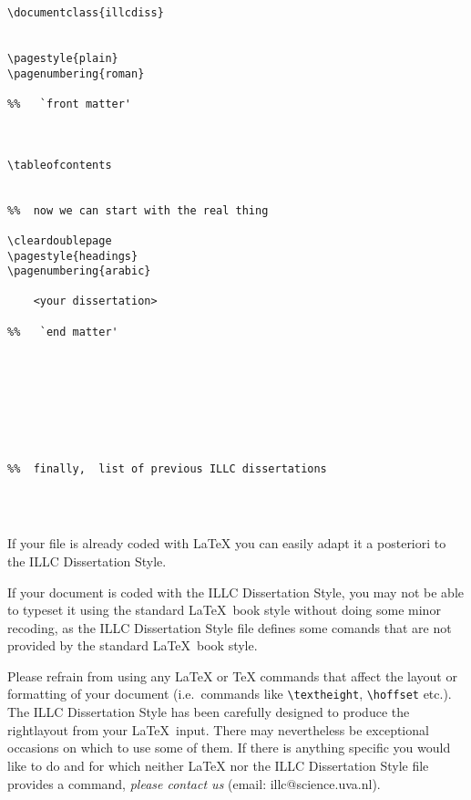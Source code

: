 \begin{verbatim}
\documentclass{illcdiss}


\pagestyle{plain}
\pagenumbering{roman}

%%   `front matter'



\tableofcontents


%%  now we can start with the real thing

\cleardoublepage
\pagestyle{headings}
\pagenumbering{arabic}
  
    <your dissertation>

%%   `end matter'








%%  finally,  list of previous ILLC dissertations




\end{verbatim}
%
%
If your file is already coded with \LaTeX{} you can easily
adapt it a posteriori to the ILLC Dissertation Style.

If your document is coded with the ILLC Dissertation Style,
you may not be able to typeset it using the standard \LaTeX\ book style
without doing some minor recoding,
as the ILLC Dissertation Style file defines some comands 
that are not provided by the standard \LaTeX\ book style.

Please refrain from using any \LaTeX{} or \TeX{} commands
that affect the layout or formatting of your document
(i.e.\ commands like \verb|\textheight|, \verb|\hoffset| etc.).
The ILLC Dissertation Style has been carefully designed 
to produce the rightlayout from your \LaTeX\ input.
There may nevertheless be exceptional occasions on which to use some of them.
If there is anything specific you would like to do 
and for which neither \LaTeX{} nor the ILLC Dissertation Style file 
provides a command,
{\em please contact us\/} (email: illc@science.uva.nl).

